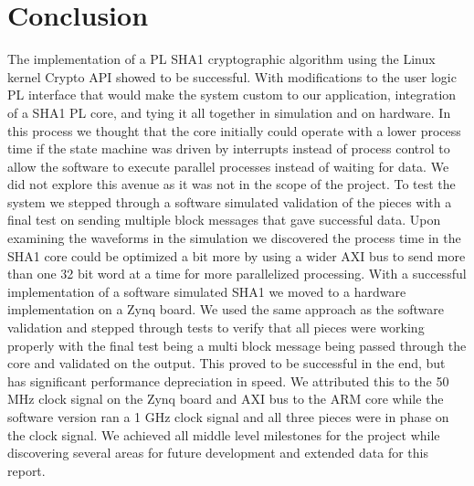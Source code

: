 \documentclass[journal]{IEEEtran}
\begin{document}
\section{Conclusion}
The implementation of a PL SHA1 cryptographic algorithm using the Linux kernel Crypto API showed to be successful.  With modifications to the user logic PL interface that would make the system custom to our application, integration of a SHA1 PL core, and tying it all together in simulation and on hardware.  In this process we thought that the core initially could operate with a lower process time if the state machine was driven by interrupts instead of process control to allow the software to execute parallel processes instead of waiting for data.  We did not explore this avenue as it was not in the scope of the project.  To test the system we stepped through a software simulated validation of the pieces with a final test on sending multiple block messages that gave successful data.  Upon examining the waveforms in the simulation we discovered the process time in the SHA1 core could be optimized a bit more by using a wider AXI bus to send more than one 32 bit word at a time for more parallelized processing.
With a successful implementation of a software simulated SHA1 we moved to a hardware implementation on a Zynq board.  We used the same approach as the software validation and stepped through tests to verify that all pieces were working properly with the final test being a multi block message being passed through the core and validated on the output.  This proved to be successful in the end, but has significant performance depreciation in speed.  We attributed this to the 50 MHz clock signal on the Zynq board and AXI bus to the ARM core while the software version ran a 1 GHz clock signal and all three pieces were in phase on the clock signal.  We achieved all middle level milestones for the project while discovering several areas for future development and extended data for this report.
\end{document}
